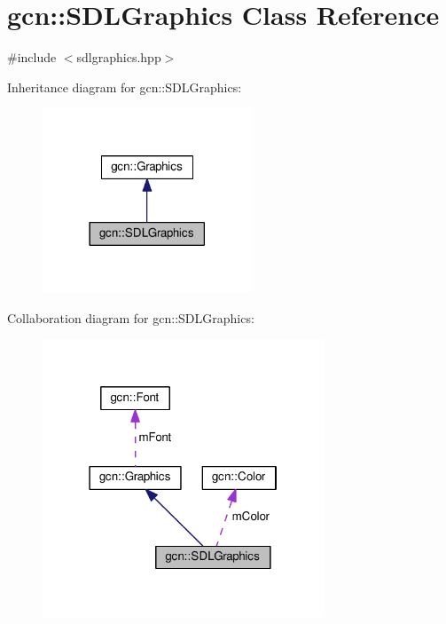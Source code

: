 \hypertarget{classgcn_1_1SDLGraphics}{}\section{gcn\+:\+:S\+D\+L\+Graphics Class Reference}
\label{classgcn_1_1SDLGraphics}


{\ttfamily \#include $<$sdlgraphics.\+hpp$>$}



Inheritance diagram for gcn\+:\+:S\+D\+L\+Graphics\+:\nopagebreak
\begin{figure}[H]
\begin{center}
\leavevmode
\includegraphics[width=177pt]{classgcn_1_1SDLGraphics__inherit__graph}
\end{center}
\end{figure}


Collaboration diagram for gcn\+:\+:S\+D\+L\+Graphics\+:\nopagebreak
\begin{figure}[H]
\begin{center}
\leavevmode
\includegraphics[width=238pt]{classgcn_1_1SDLGraphics__coll__graph}
\end{center}
\end{figure}
